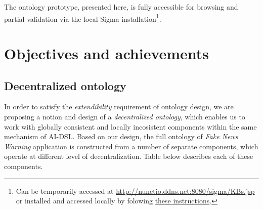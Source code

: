\documentclass[]{report}
\begin{document}
The ontology prototype, presented here, is fully accessible for browsing and
partial validation via the local Sigma installation\footnote{Can be temporarily
accessed at \href{http://nunetio.ddns.net:8080/sigma/KBs.jsp}
{http://nunetio.ddns.net:8080/sigma/KBs.jsp} or installed and accessed locally
by folowing \href{}{these instructions}.}.

\section{Objectives and achievements}

\subsection{Decentralized ontology}

In order to satisfy the \textit{extendibility} requirement of ontology design,
we are proposing a notion and design of a \textit{decentralized ontology}, which
enables us to work with globally consistent and locally incosistent components
within the same mechanism of AI-DSL. Based on our design, the full ontology of
\textit{Fake News Warning} application is constructed from a number of separate
components, which operate at different level of decentralization. Table below
describes each of these components.
\end{document}
